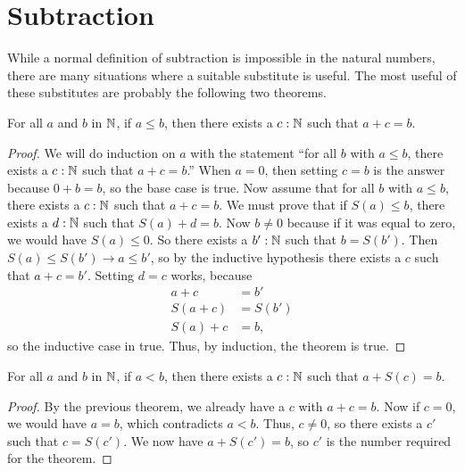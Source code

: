 \documentclass[../../math.tex]{subfiles}
\begin{document}
\section{Subtraction}

While a normal definition of subtraction is impossible in the natural numbers,
there are many situations where a suitable substitute is useful.  The most
useful of these substitutes are probably the following two theorems.

\begin{theorem} \label{nat_le_ex}
    For all $a$ and $b$ in $\mathbb{N}$, if $a \leq b$, then there exists a $c : \mathbb{N}$
    such that $a + c = b$.
\end{theorem}
\begin{proof}
    We will do induction on $a$ with the statement ``for all $b$ with $a \leq
    b$, there exists a $c : \mathbb{N}$ such that $a + c = b$.''  When $a = 0$, then
    setting $c = b$ is the answer because $0 + b = b$, so the base case is true.
    Now assume that for all $b$ with $a \leq b$, there exists a $c : \mathbb{N}$ such
    that $a + c = b$.  We must prove that if $S(a) \leq b$, there exists a $d :
    \mathbb{N}$ such that $S(a) + d = b$.  Now $b \neq 0$ because if it was equal to
    zero, we would have $S(a) \leq 0$.  So there exists a $b' : \mathbb{N}$ such that $b
    = S(b')$.  Then $S(a) \leq S(b') \rightarrow a \leq b'$, so by the inductive
    hypothesis there exists a $c$ such that $a + c = b'$.  Setting $d = c$
    works, because
    \begin{align*}
        a + c &= b' \\
        S(a + c) &= S(b') \\
        S(a) + c &= b,
    \end{align*}
    so the inductive case in true.  Thus, by induction, the theorem is true.
\end{proof}

\begin{theorem} \label{nat_lt_ex}
    For all $a$ and $b$ in $\mathbb{N}$, if $a < b$, then there exists a $c : \mathbb{N}$
    such that $a + S(c) = b$.
\end{theorem}
\begin{proof}
    By the previous theorem, we already have a $c$ with $a + c = b$.  Now if $c
    = 0$, we would have $a = b$, which contradicts $a < b$.  Thus, $c \neq 0$,
    so there exists a $c'$ such that $c = S(c')$.  We now have $a + S(c') = b$,
    so $c'$ is the number required for the theorem.
\end{proof}
\end{document}
